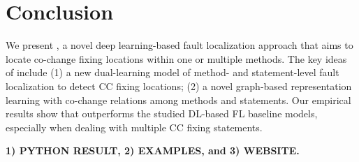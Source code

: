 \section{Conclusion}

We present {\tool}, a novel deep learning-based fault localization
approach that aims to locate co-change fixing locations within one or
multiple methods. The key ideas of {\tool} include (1) a new
dual-learning model of method- and statement-level fault localization
to detect CC fixing locations; (2) a novel graph-based representation
learning with co-change relations among methods and statements. Our
empirical results show that {\tool} outperforms the studied DL-based
FL baseline models, especially when dealing with multiple CC fixing
statements.

{\bf 1) PYTHON RESULT, 2) EXAMPLES, and 3) WEBSITE.}


